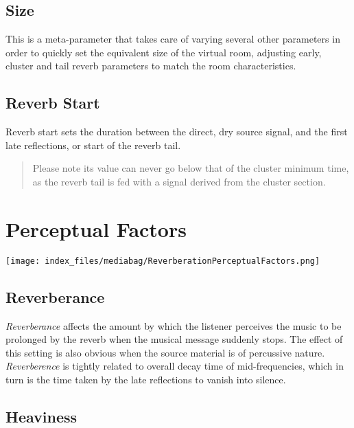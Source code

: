 \documentclass[
  letterpaper,
  DIV=11,
  numbers=noendperiod]{scrreport}
\begin{document}
\hypertarget{size}{%
\subsection{Size}\label{size}}

This is a meta-parameter that takes care of varying several other
parameters in order to quickly set the equivalent size of the virtual
room, adjusting early, cluster and tail reverb parameters to match the
room characteristics.

\hypertarget{reverb-start}{%
\subsection{Reverb Start}\label{reverb-start}}

Reverb start sets the duration between the direct, dry source signal,
and the first late reflections, or start of the reverb tail.

\begin{quote}
Please note its value can never go below that of the cluster minimum
time, as the reverb tail is fed with a signal derived from the cluster
section.
\end{quote}

\hypertarget{perceptual-factors}{%
\section{Perceptual Factors}\label{perceptual-factors}}

\texttt{[image: index\_files/mediabag/ReverberationPerceptualFactors.png]}

\hypertarget{reverberance}{%
\subsection{Reverberance}\label{reverberance}}

\emph{Reverberance} affects the amount by which the listener perceives
the music to be prolonged by the reverb when the musical message
suddenly stops. The effect of this setting is also obvious when the
source material is of percussive nature. \emph{Reverberence} is tightly
related to overall decay time of mid-frequencies, which in turn is the
time taken by the late reflections to vanish into silence.

\hypertarget{heaviness}{%
\subsection{Heaviness}\label{heaviness}}
\end{document}
